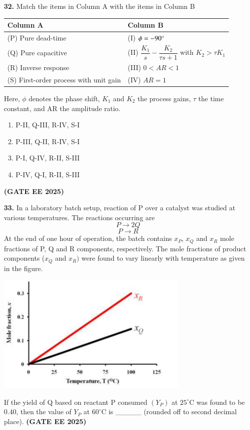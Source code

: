 \documentclass[journal,12pt,onecolumn]{IEEEtran}
\newcommand{\brak}[1]{(#1)}
\begin{document}
\noindent\textbf{32.} Match the items in Column A with the items in Column B
\begin{longtable}{|p{4cm}|p{6cm}|}
\hline
\textbf{Column A} & \textbf{Column B} \\
\hline
\brak{P} Pure dead-time & \brak{I} $\phi=-90\degree$ \\
\hline
\brak{Q} Pure capacitive & \brak{II} $\dfrac{K_{1}}{s}-\dfrac{K_{2}}{\tau s+1}$ with $K_{2}>\tau K_{1}$ \\
\hline
\brak{R} Inverse response & \brak{III} $0<AR<1$ \\
\hline
\brak{S} First-order process with unit gain & \brak{IV} $AR=1$ \\
\hline
\end{longtable}
Here, $\phi$ denotes the phase shift, $K_{1}$ and $K_{2}$ the process gains, $\tau$ the time constant, and AR the amplitude ratio.
\begin{enumerate}
    \item P-II, Q-III, R-IV, S-I
    \item P-III, Q-II, R-IV, S-I
    \item P-I, Q-IV, R-II, S-III
    \item P-IV, Q-I, R-II, S-III
\end{enumerate}

\hfill \textbf{\brak{GATE EE 2025}}

\noindent\textbf{33.} In a laboratory batch setup, reaction of P over a catalyst was studied at various temperatures. The reactions occurring are
\[ P\rightarrow2Q \]
\[ P\rightarrow R \]
At the end of one hour of operation, the batch contains $x_{P}$, $x_{Q}$ and $x_{R}$ mole fractions of P, Q and R components, respectively. The mole fractions of product components \brak{$x_{Q}$ and $x_{R}}$ were found to vary linearly with temperature as given in the figure.
\begin{center}
\includegraphics[width=0.7\textwidth]{figs/33.png}
\end{center}
If the yield of Q based on reactant P consumed $\brak{Y_{P}}$ at $25^{\circ}\text{C}$ was found to be 0.40, then the value of $Y_{P}$ at $60^{\circ}\text{C}$ is \_\_\_\_\_ \brak{rounded off to second decimal place}.
\hfill \textbf{\brak{GATE EE 2025}}
\end{document}
